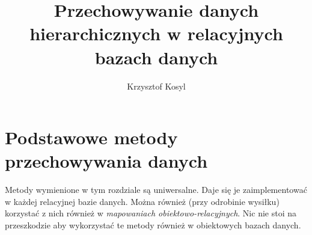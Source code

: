 \documentclass[11pt,a4paper,oneside]{report}
\author{Krzysztof Kosyl}
\title{Przechowywanie danych hierarchicznych w relacyjnych bazach danych}
\begin{document}





\tableofcontents{}






\chapter{Podstawowe metody przechowywania danych}

Metody wymienione w tym rozdziale są uniwersalne. Daje się je zaimplementować w każdej relacyjnej bazie danych. 
Można również (przy odrobinie wysiłku) korzystać z nich również w \emph{mapowaniach obiektowo-relacyjnych}.
Nic nie stoi na przeszkodzie aby wykorzystać te metody również w obiektowych bazach danych.

	
    \clearpage

	
	\clearpage

	
	\clearpage

	
	\clearpage
	
	
	\clearpage
\end{document}
